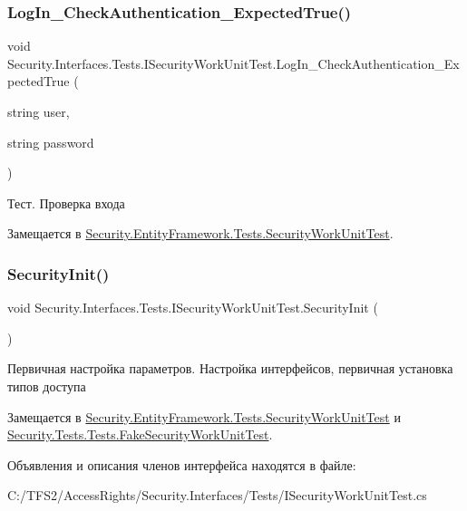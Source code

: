 \subsubsection{\texorpdfstring{Log\+In\+\_\+\+Check\+Authentication\+\_\+\+Expected\+True()}{LogIn\_CheckAuthentication\_ExpectedTrue()}}
{\footnotesize\ttfamily void Security.\+Interfaces.\+Tests.\+I\+Security\+Work\+Unit\+Test.\+Log\+In\+\_\+\+Check\+Authentication\+\_\+\+Expected\+True (\begin{DoxyParamCaption}\item[{string}]{user,  }\item[{string}]{password }\end{DoxyParamCaption})}



Тест. Проверка входа 



Замещается в \hyperlink{class_security_1_1_entity_framework_1_1_tests_1_1_security_work_unit_test_a7fa1055e919319077b7507ac458a954e}{Security.\+Entity\+Framework.\+Tests.\+Security\+Work\+Unit\+Test}.

\mbox{\label{interface_security_1_1_interfaces_1_1_tests_1_1_i_security_work_unit_test_ad4c83a70952c1dfcdc15c1dc29b223a2}} 
\subsubsection{\texorpdfstring{Security\+Init()}{SecurityInit()}}
{\footnotesize\ttfamily void Security.\+Interfaces.\+Tests.\+I\+Security\+Work\+Unit\+Test.\+Security\+Init (\begin{DoxyParamCaption}{ }\end{DoxyParamCaption})}



Первичная настройка параметров. Настройка интерфейсов, первичная установка типов доступа 



Замещается в \hyperlink{class_security_1_1_entity_framework_1_1_tests_1_1_security_work_unit_test_acf6d718d3dbd7c4ece47dddef6f1e6f8}{Security.\+Entity\+Framework.\+Tests.\+Security\+Work\+Unit\+Test} и \hyperlink{class_security_1_1_tests_1_1_tests_1_1_fake_security_work_unit_test_ab6d881ce39c896f7cc73eaa6946f3132}{Security.\+Tests.\+Tests.\+Fake\+Security\+Work\+Unit\+Test}.



Объявления и описания членов интерфейса находятся в файле\+:\begin{DoxyCompactItemize}
\item 
C\+:/\+T\+F\+S2/\+Access\+Rights/\+Security.\+Interfaces/\+Tests/I\+Security\+Work\+Unit\+Test.\+cs\end{DoxyCompactItemize}
